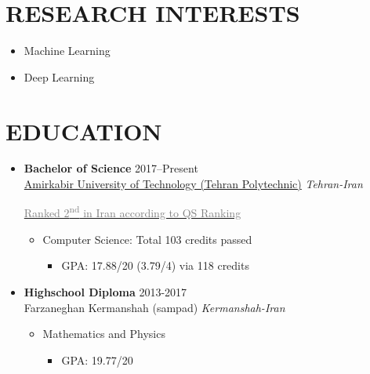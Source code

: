 \documentclass[10pt,a4paper,sans]{moderncv} %
\begin{document}
	
	\makecvtitle
	
	\section{RESEARCH INTERESTS}
	\begin{itemize}
		\item Machine Learning
		\item Deep Learning
	\end{itemize}

	\section{EDUCATION}
	
	\begin{itemize}

		\item \textbf{Bachelor of Science} \hfill 2017--Present \\
		\href{http://aut.ac.ir/}{ {Amirkabir University of Technology (Tehran Polytechnic)}} \hfill \emph{Tehran-Iran}

		\href{https://www.topuniversities.com/university-rankings/world-university-rankings/2021}{\textcolor{gray} {Ranked 2\textsuperscript{nd} in Iran according to QS Ranking}}
		
		\begin{itemize}
			\item Computer Science: Total 103 credits passed
			\begin{itemize}		
				\item GPA: 17.88/20 (3.79/4) via 118 credits
			\end{itemize}
		\end{itemize}
		\vspace{0.5em}

		
		\item \textbf{Highschool Diploma} \hfill 2013-2017 \\
		{ {Farzaneghan Kermanshah (sampad)}} \hfill \emph{Kermanshah-Iran}
		
		\begin{itemize}
			\item Mathematics and Physics
			\begin{itemize}		
				\item GPA: 19.77/20
			\end{itemize}
		\end{itemize}
		
	\end{itemize}
\end{document}

